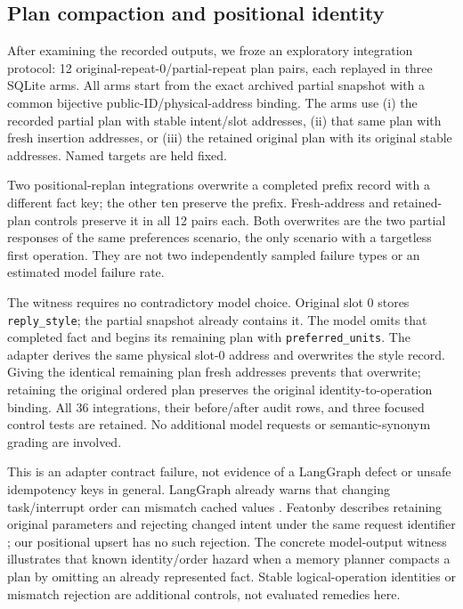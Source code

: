 \subsection{Plan compaction and positional identity}
\label{sec:binding}
After examining the recorded outputs, we froze an exploratory integration protocol: 12 original-repeat-0/partial-repeat plan pairs, each replayed in three SQLite arms. All arms start from the exact archived partial snapshot with a common bijective public-ID/physical-address binding. The arms use (i) the recorded partial plan with stable intent/slot addresses, (ii) that same plan with fresh insertion addresses, or (iii) the retained original plan with its original stable addresses. Named targets are held fixed.

Two positional-replan integrations overwrite a completed prefix record with a different fact key; the other ten preserve the prefix. Fresh-address and retained-plan controls preserve it in all 12 pairs each. Both overwrites are the two partial responses of the same preferences scenario, the only scenario with a targetless first operation. They are not two independently sampled failure types or an estimated model failure rate.

The witness requires no contradictory model choice. Original slot 0 stores \texttt{reply\_style}; the partial snapshot already contains it. The model omits that completed fact and begins its remaining plan with \texttt{preferred\_units}. The adapter derives the same physical slot-0 address and overwrites the style record. Giving the identical remaining plan fresh addresses prevents that overwrite; retaining the original ordered plan preserves the original identity-to-operation binding. All 36 integrations, their before/after audit rows, and three focused control tests are retained. No additional model requests or semantic-synonym grading are involved.

This is an adapter contract failure, not evidence of a LangGraph defect or unsafe idempotency keys in general. LangGraph already warns that changing task/interrupt order can mismatch cached values \cite{langchainGraphAPI}. Featonby describes retaining original parameters and rejecting changed intent under the same request identifier \cite{featonbyIdempotentAPIs}; our positional upsert has no such rejection. The concrete model-output witness illustrates that known identity/order hazard when a memory planner compacts a plan by omitting an already represented fact. Stable logical-operation identities or mismatch rejection are additional controls, not evaluated remedies here.
